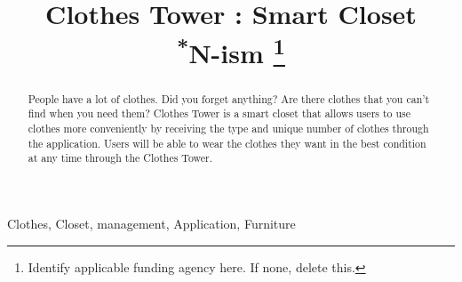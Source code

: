 \documentclass[conference]{IEEEtran}
\begin{document}
\title{Clothes Tower : Smart Closet\\
{\footnotesize \textsuperscript{*}N-ism}
\thanks{Identify applicable funding agency here. If none, delete this.}
}

\author{
\and
{}
\and
{}
\and
{}
}

\maketitle

\begin{abstract}
People have a lot of clothes. Did you forget anything? Are there clothes that you can't find when you need them? Clothes Tower is a smart closet that allows users to use clothes more conveniently by receiving the  type and unique number of clothes through the application. Users will be able to wear the clothes they want in the best condition at any time through the Clothes Tower.
\end{abstract}

\begin{IEEEkeywords}
Clothes, Closet, management, Application, Furniture
\end{IEEEkeywords}
\end{document}
